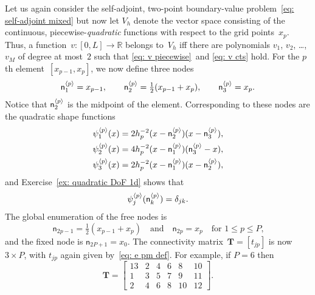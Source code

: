 Let us again consider the self-adjoint, two-point boundary-value 
problem~\eqref{eq: self-adjoint mixed} but now let $V_h$ denote the vector 
space consisting of the continuous, piecewise-\emph{quadratic} functions with 
respect to the grid points~$x_p$.  Thus, a function~$v:[0,L]\to\mathbb{R}$ 
belongs to~$V_h$ iff there are polynomials $v_1$, $v_2$, \dots, $v_M$ of degree 
at most~$2$ such that \eqref{eq: v piecewise}~and \eqref{eq: v cts} hold.
For the $p$th element~$[x_{p-1},x_p]$, we now define three nodes
\[
\mathsf{n}^{\langle p\rangle}_1=x_{p-1},\qquad
\mathsf{n}^{\langle p\rangle}_2=\tfrac12(x_{p-1}+x_p),\qquad
\mathsf{n}^{\langle p\rangle}_3=x_p.
\]
Notice that $\mathsf{n}^{\langle p\rangle}_2$ is the midpoint of the element.
Corresponding to these nodes are the quadratic shape functions
\begin{equation}\label{eq: quadratic psi 1d}
\begin{aligned}
\psi^{\langle p\rangle}_1(x)
	&=2h_p^{-2}(x-\mathsf{n}^{\langle p\rangle}_2)(x-\mathsf{n}^{\langle p\rangle}_3),\\
\psi^{\langle p\rangle}_2(x)
	&=4h_p^{-2}(x-\mathsf{n}^{\langle p\rangle}_1)(\mathsf{n}^{\langle p\rangle}_3-x),\\
\psi^{\langle p\rangle}_3(x)
	&=2h_p^{-2}(x-\mathsf{n}^{\langle p\rangle}_1)(x-\mathsf{n}^{\langle p\rangle}_2),
\end{aligned}
\end{equation}
and Exercise~\ref{ex: quadratic DoF 1d} shows that
\begin{equation}\label{eq: quadratic DoF 1d}
\psi^{\langle p\rangle}_j(\mathsf{n}^{\langle p\rangle}_k)=\delta_{jk}.
\end{equation}
The global enumeration of the free nodes is
\[
\mathsf{n}_{2p-1}=\tfrac12(x_{p-1}+x_p)
\quad\text{and}\quad
\mathsf{n}_{2p}=x_p\quad\text{for $1\le p\le P$,}
\]
and the fixed node is $\mathsf{n}_{2P+1}=x_0$.  The connectivity 
matrix~$\boldsymbol{T}=[t_{jp}]$ is now $3\times P$, with $t_{jp}$ again given 
by~\eqref{eq: e pm def}.  For example, if $P=6$ then 
\[
\boldsymbol{T}=\begin{bmatrix}
13&2&4&6&8&10\\
 1&3&5&7&9&11\\
 2&4&6&8&10&12          
\end{bmatrix}.
\]

